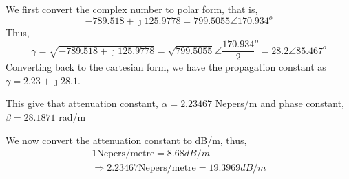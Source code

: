 \begin{exmp}
We first convert the complex number to polar form, that is,
\begin{equation*}
-789.518 + \jmath 125.9778 = 799.5055\angle 170.934^o
\end{equation*}
Thus,
\begin{dmath*}
\gamma = \sqrt{-789.518 + \jmath 125.9778}
= \sqrt{799.5055}\angle {\frac{170.934}{2}}^o
=28.2\angle 85.467^o
\end{dmath*}
Converting back to the cartesian form, we have the propagation constant as $\gamma=2.23 +\jmath 28.1$.

This give that attenuation constant, $\alpha = 2.23467 $ Nepers/m and phase constant, $ \beta = 28.1871 $ rad/m

We now convert the attenuation constant to dB/m, thus,
\begin{align*}
1 \text{Nepers/metre} = 8.68dB/m\\
\Rightarrow 2.23467 \text{Nepers/metre} = 19.3969 dB/m
\end{align*}
\end{exmp} 

